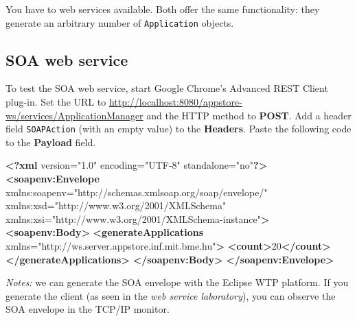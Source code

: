 \documentclass[]{report}
\newenvironment{Shaded}{}{}
\newcommand{\KeywordTok}[1]{\textcolor[rgb]{0.00,0.44,0.13}{\textbf{{#1}}}}
\newcommand{\StringTok}[1]{\textcolor[rgb]{0.25,0.44,0.63}{{#1}}}
\newcommand{\OtherTok}[1]{\textcolor[rgb]{0.00,0.44,0.13}{{#1}}}
\newcommand{\NormalTok}[1]{{#1}}
\begin{document}
You have to web services available. Both offer the same functionality:
they generate an arbitrary number of \texttt{Application} objects.

\subsection{SOA web service}

To test the SOA web service, start Google Chrome's Advanced REST Client
plug-in. Set the URL to
\url{http://localhost:8080/appstore-ws/services/ApplicationManager} and
the HTTP method to \textbf{POST}. Add a header field \texttt{SOAPAction}
(with an empty value) to the \textbf{Headers}. Paste the following code
to the \textbf{Payload} field.

\begin{Shaded}
\begin{Highlighting}[]
\KeywordTok{<?xml} \NormalTok{version="1.0" encoding="UTF-8" standalone="no"}\KeywordTok{?>}
\KeywordTok{<soapenv:Envelope}\OtherTok{ xmlns:soapenv=}\StringTok{"http://schemas.xmlsoap.org/soap/envelope/"} 
\OtherTok{  xmlns:xsd=}\StringTok{"http://www.w3.org/2001/XMLSchema"} 
\OtherTok{  xmlns:xsi=}\StringTok{"http://www.w3.org/2001/XMLSchema-instance"}\KeywordTok{>}
  \KeywordTok{<soapenv:Body>}
    \KeywordTok{<generateApplications}\OtherTok{ xmlns=}\StringTok{"http://ws.server.appstore.inf.mit.bme.hu"}\KeywordTok{>}
      \KeywordTok{<count>}\NormalTok{20}\KeywordTok{</count>}
    \KeywordTok{</generateApplications>}
  \KeywordTok{</soapenv:Body>}
\KeywordTok{</soapenv:Envelope>}
\end{Highlighting}
\end{Shaded}

\emph{Notes:} we can generate the SOA envelope with the Eclipse WTP
platform. If you generate the client (as seen in the \emph{web service
laboratory}), you can observe the SOA envelope in the TCP/IP monitor.
\end{document}
